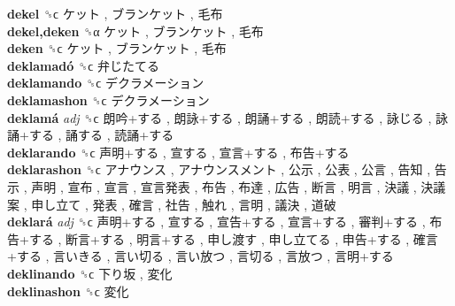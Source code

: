 \textbf{dekel} ␝ϲ   ケット ,  ブランケット ,  毛布   \\
\textbf{dekel,deken} ␝α   ケット ,  ブランケット ,  毛布   \\
\textbf{deken} ␝ϲ   ケット ,  ブランケット ,  毛布   \\
\textbf{deklamadó} ␝ϲ   弁じたてる   \\
\textbf{deklamando} ␝ϲ   デクラメーション   \\
\textbf{deklamashon} ␝ϲ   デクラメーション   \\
\textbf{deklamá} \emph{adj}  ␝ϲ   朗吟+する ,  朗詠+する ,  朗誦+する ,  朗読+する ,  詠じる ,  詠誦+する ,  誦する ,  読誦+する   \\
\textbf{deklarando} ␝ϲ   声明+する ,  宣する ,  宣言+する ,  布告+する   \\
\textbf{deklarashon} ␝ϲ   アナウンス ,  アナウンスメント ,  公示 ,  公表 ,  公言 ,  告知 ,  告示 ,  声明 ,  宣布 ,  宣言 ,  宣言発表 ,  布告 ,  布達 ,  広告 ,  断言 ,  明言 ,  決議 ,  決議案 ,  申し立て ,  発表 ,  確言 ,  社告 ,  触れ ,  言明 ,  議決 ,  道破   \\
\textbf{deklará} \emph{adj}  ␝ϲ   声明+する ,  宣する ,  宣告+する ,  宣言+する ,  審判+する ,  布告+する ,  断言+する ,  明言+する ,  申し渡す ,  申し立てる ,  申告+する ,  確言+する ,  言いきる ,  言い切る ,  言い放つ ,  言切る ,  言放つ ,  言明+する   \\
\textbf{deklinando} ␝ϲ   下り坂 ,  変化   \\
\textbf{deklinashon} ␝ϲ   変化   \\
